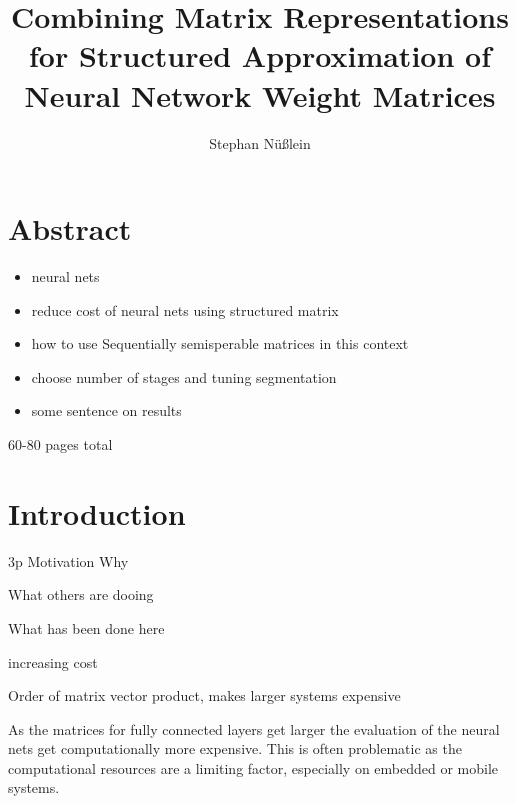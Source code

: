 \documentclass[doctype=mastersthesis,BCOR=15mm,biblatex]{ldvbook}%
\begin{document}
\title{Combining Matrix Representations for Structured Approximation of Neural Network Weight Matrices}
\author{Stephan Nüßlein}


\maketitle[frontcover=Design1]


\chapter*{Abstract}

\begin{itemize}
	\item neural nets
	\item reduce cost of neural nets using structured matrix
	\item how to use Sequentially semisperable matrices in this context
	\item choose number of stages and tuning segmentation
	\item some sentence on results
\end{itemize}


\tableofcontents

60-80 pages total






\chapter{Introduction} 3p
Motivation Why

What others are dooing

What has been done here

increasing cost

Order of matrix vector product, makes larger systems expensive


As the matrices for fully connected layers get larger the evaluation of the neural nets get computationally more expensive. This is often problematic as the computational resources are a limiting factor, especially on embedded or mobile systems.
\end{document}
